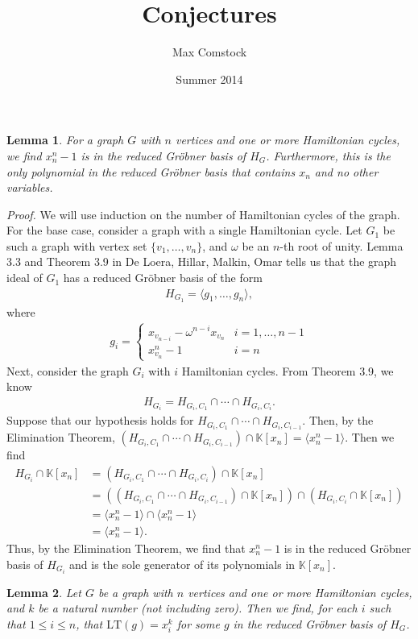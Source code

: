\documentclass[letterpaper]{article}
\title{Conjectures}
\author{Max Comstock}
\date{Summer 2014}
\newtheorem{lemma}{Lemma}
\newcommand{\aln}[1]{\begin{align*} #1 \end{align*}} %
\begin{document}
\maketitle

\begin{lemma}
	For a graph $G$ with $n$ vertices and one or more Hamiltonian cycles, we find $x_n^n - 1$ is in the reduced Gr\"obner basis of $H_G$. Furthermore, this is the only polynomial in the reduced Gr\"obner basis that contains $x_n$ and no other variables.
\end{lemma}

\emph{Proof.} We will use induction on the number of Hamiltonian cycles of the graph. For the base case, consider a graph with a single Hamiltonian cycle. Let $G_1$ be such a graph with vertex set $\{v_1, \ldots, v_n\}$, and $\omega$ be an $n$-th root of unity. Lemma 3.3 and Theorem 3.9 in De Loera, Hillar, Malkin, Omar tells us that the graph ideal of $G_1$ has a reduced Gr\"obner basis of the form
\aln{
	H_{G_1} = \langle g_1, \ldots, g_n \rangle,
}
where
\aln{
	g_i = \left \{ \begin{array}{ll} x_{v_{n-i}} - \omega^{n-i} x_{v_n} & i = 1,\ldots,n-1\\
		x_{v_n}^n - 1 & i = n \end{array} \right .
}
Next, consider the graph $G_i$ with $i$ Hamiltonian cycles. From Theorem 3.9, we know
\aln{
	H_{G_i} = H_{G_i, C_1} \cap \cdots \cap H_{G_i, C_i}.
}
Suppose that our hypothesis holds for $H_{G_i, C_1} \cap \cdots \cap H_{G_i, C_{i-1}}$. Then, by the Elimination Theorem, $(H_{G_i, C_1} \cap \cdots \cap H_{G_i, C_{i-1}}) \cap \mathbb{K}[x_n] = \langle x_n^n - 1 \rangle$. Then we find
\aln{
	H_{G_i} \cap \mathbb{K}[x_n] &= (H_{G_i, C_1} \cap \cdots \cap H_{G_i, C_i}) \cap \mathbb{K}[x_n]\\
	&= ((H_{G_i, C_1} \cap \cdots \cap H_{G_i, C_{i-1}}) \cap \mathbb{K}[x_n]) \cap (H_{G_i, C_i} \cap \mathbb{K}[x_n])\\
	&= \langle x_n^n - 1 \rangle \cap \langle x_n^n - 1 \rangle\\
	&= \langle x_n^n - 1 \rangle.
}
Thus, by the Elimination Theorem, we find that $x_n^n - 1$ is in the reduced Gr\"obner basis of $H_{G_i}$ and is the sole generator of its polynomials in $\mathbb{K}[x_n]$.

\begin{lemma}
	Let $G$ be a graph with $n$ vertices and one or more Hamiltonian cycles, and $k$ be a natural number (not including zero). Then we find, for each $i$ such that $1 \leq i \leq n$, that $\mathrm{LT}(g) = x_i^k$ for some $g$ in the reduced Gr\"obner basis of $H_G$.
\end{lemma}
\end{document}
